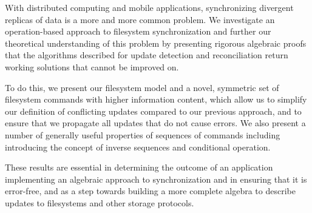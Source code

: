 
With distributed computing and mobile applications,
synchronizing divergent replicas of data is a more and more common problem.
We investigate an operation-based approach to filesystem synchronization
and further our theoretical understanding of this problem
by presenting rigorous algebraic proofs that the algorithms described for
update detection and reconciliation return working solutions
that cannot be improved on.

To do this, we present our filesystem model 
and a novel, symmetric set of filesystem commands
with higher information content,
which allow us to simplify our definition of conflicting updates
compared to our previous approach,
and to ensure that we propagate all updates that do not cause errors.
We also present a number of generally useful properties of sequences of commands
including introducing the concept of inverse sequences and conditional operation.

These results are essential in
determining the outcome of an
application implementing an algebraic approach to synchronization
and in ensuring that it is error-free,
and as a step towards building a more complete algebra
to describe updates to filesystems and other storage protocols.
